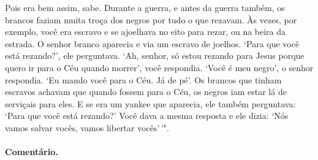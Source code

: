Pois era bem assim, sabe. Durante a guerra, e antes da guerra também, os
brancos faziam muita troça dos negros por tudo o que rezavam. Às vezes,
por exemplo, você era escravo e se ajoelhava no eito para rezar, ou na
beira da estrada. O senhor branco aparecia e via um escravo de joelhos.
`Para que você está rezando?', ele perguntava. `Ah, senhor, só estou
rezando para Jesus porque quero ir para o Céu quando morrer', você
respondia. `Você é meu negro', o senhor respondia. `Eu mando você
para o Céu. Já de pé'. Os brancos que tinham escravos achavam que
quando fossem para o Céu, os negros iam estar lá de serviçais para eles.
E se era um yankee que aparecia, ele também perguntava: `Para que você
está rezando?' Você dava a mesma resposta e ele dizia: `Nós vamos
salvar vocês, vamos libertar vocês'\,'".

\paragraph{Comentário.}\quad
